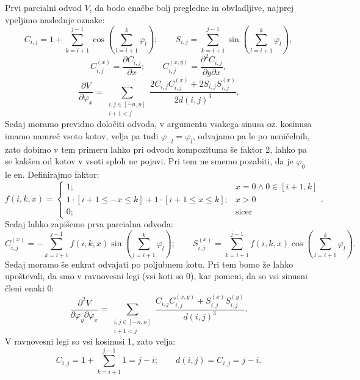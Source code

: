 \documentclass{article}
\begin{document}
Prvi parcialni odvod $V$, da bodo enačbe bolj pregledne in obvladljive, najprej vpeljimo naslednje oznake:
\begin{equation}
    C_{i,j}=1+\sum_{k=i+1}^{j-1}\cos\left(\sum_{l=i+1}^{k}\varphi_l\right);\qquad S_{i,j}=\sum_{k=i+1}^{j-1}\sin\left(\sum_{l=i+1}^{k}\varphi_l\right),
\end{equation}
\begin{equation}
    C_{i,j}^{(x)}=\frac{\partial C_{i,j}}{\partial x};\qquad C_{i,j}^{(x,y)}=\frac{\partial^2 C_{i,j}}{\partial y\partial x},
\end{equation}
\begin{equation}
    \frac{\partial V}{\partial\varphi_x}=\sum_{\substack{i,j\in[-n,n]\\i+1<j}}\frac{2C_{i,j}C_{i,j}^{(x)}+2S_{i,j}S_{i,j}^{(x)}}{2d(i,j)^3}.
\end{equation}
Sedaj moramo previdno določiti odvoda, v argumentu vsakega sinusa oz. kosinusa imamo namreč vsoto kotov, velja pa tudi $\varphi_{-l}=\varphi_l$, odvajamo pa le po neničelnih, zato dobimo v tem primeru lahko pri odvodu kompozituma še faktor 2, lahko pa se kakšen od kotov v vsoti sploh ne pojavi. Pri tem ne smemo pozabiti, da je $\varphi_0$ le en. Definirajmo faktor:
\begin{equation}
    f(i,k,x)=\begin{cases}
        1;& x=0\wedge 0\in[i+1,k]\\
        1\cdot[i+1\le -x\le k]+1\cdot[i+1\le x\le k];&x>0\\
        0;&\text{sicer}
    \end{cases}.
    \label{eq:f}
\end{equation}
Sedaj lahko zapišemo prva parcialna odvoda:
\begin{equation}
    C_{i,j}^{(x)}=-\sum_{k=i+1}^{j-1}f(i,k,x)\sin\left(\sum_{l=i+1}^k\varphi_l\right);\qquad S_{i,j}^{(x)}=\sum_{k=i+1}^{j-1}f(i,k,x)\cos\left(\sum_{l=i+1}^k\varphi_l\right).
\end{equation}
Sedaj moramo še enkrat odvajati po poljubnem kotu. Pri tem bomo že lahko upoštevali, da smo v ravnovesni legi (vsi koti so 0), kar pomeni, da so vsi sinusni členi enaki 0:
\begin{equation}
    \frac{\partial^2V}{\partial\varphi_y\partial\varphi_x}=\sum_{\substack{i,j\in[-n,n]\\i+1<j}}\frac{C_{i,j}C_{i,j}^{(x,y)}+S_{i,j}^{(x)}S_{i,j}^{(y)}}{d(i,j)^3}.
\end{equation}
V ravnovesni legi so vsi kosinusi 1, zato velja:
\begin{equation}
    C_{i,j}=1+\sum_{k=i+1}^{j-1}1=j-i;\qquad d(i,j)=C_{i,j}=j-i.
\end{equation}
\end{document}
